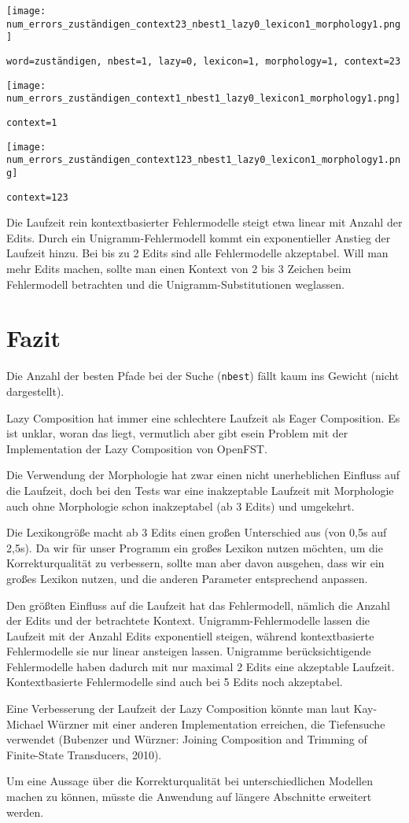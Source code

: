 \documentclass[12pt]{article}
\begin{document}
\texttt{[image: num\_errors\_zuständigen\_context23\_nbest1\_lazy0\_lexicon1\_morphology1.png]}

\verb+word=zuständigen, nbest=1, lazy=0, lexicon=1, morphology=1, context=23+

\texttt{[image: num\_errors\_zuständigen\_context1\_nbest1\_lazy0\_lexicon1\_morphology1.png]}

\verb+context=1+

\texttt{[image: num\_errors\_zuständigen\_context123\_nbest1\_lazy0\_lexicon1\_morphology1.png]}

\verb+context=123+

Die Laufzeit rein kontextbasierter Fehlermodelle steigt etwa linear mit Anzahl
der Edits.
Durch ein Unigramm-Fehlermodell kommt ein exponentieller Anstieg der Laufzeit
hinzu.
Bei bis zu 2 Edits sind alle Fehlermodelle akzeptabel.
Will man mehr Edits machen, sollte man einen Kontext von 2 bis 3 Zeichen beim
Fehlermodell betrachten und die Unigramm-Substitutionen weglassen.


\section{Fazit}

Die Anzahl der besten Pfade bei der Suche (\verb+nbest+) fällt kaum ins Gewicht (nicht
dargestellt).

Lazy Composition hat immer eine schlechtere Laufzeit als Eager Composition.
Es ist unklar, woran das liegt, vermutlich aber gibt esein Problem mit der
Implementation der Lazy Composition von OpenFST.

Die Verwendung der Morphologie hat zwar einen nicht unerheblichen Einfluss
auf die Laufzeit, doch bei den Tests war eine inakzeptable Laufzeit mit
Morphologie auch ohne Morphologie schon inakzeptabel (ab 3 Edits) und
umgekehrt.

Die Lexikongröße macht ab 3 Edits einen großen Unterschied aus (von 0,5s
auf 2,5s).
Da wir für unser Programm ein großes Lexikon nutzen möchten, um die
Korrekturqualität zu verbessern, sollte man aber davon ausgehen, dass wir
ein großes Lexikon nutzen, und die anderen Parameter entsprechend anpassen.

Den größten Einfluss auf die Laufzeit hat das Fehlermodell, nämlich die
Anzahl der Edits und der betrachtete Kontext.
%
Unigramm-Fehlermodelle lassen die Laufzeit mit der Anzahl Edits
exponentiell steigen, während kontextbasierte Fehlermodelle sie nur linear
ansteigen lassen.
%
Unigramme berücksichtigende Fehlermodelle haben dadurch mit nur maximal 2
Edits eine akzeptable Laufzeit. Kontextbasierte Fehlermodelle sind auch bei
5 Edits noch akzeptabel.

Eine Verbesserung der Laufzeit der Lazy Composition könnte man laut
Kay-Michael Würzner mit einer anderen Implementation erreichen, die
Tiefensuche verwendet (Bubenzer und Würzner: Joining Composition and
Trimming of Finite-State Transducers, 2010).

Um eine Aussage über die Korrekturqualität bei unterschiedlichen Modellen
machen zu können, müsste die Anwendung auf längere Abschnitte erweitert
werden.
\end{document}
